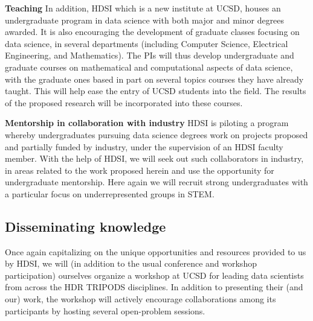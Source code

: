 \documentclass{article}
\begin{document}
{\bf Teaching} In addition,  HDSI which is a new institute at UCSD, houses an undergraduate program in data science with both major and minor degrees awarded.  It is also encouraging the development of graduate classes focusing on data science, in several departments (including Computer Science, Electrical Engineering, and Mathematics). The PIs will thus develop undergraduate and graduate courses on mathematical and computational aspects of data science, with the graduate ones based in part on several topics courses
they have already taught. This will help ease the entry of UCSD  students into the field. The
results of the proposed research will be incorporated into these courses. 

{\bf Mentorship in collaboration with industry} HDSI is piloting a program whereby undergraduates pursuing data science degrees work on projects proposed and partially funded by industry, under the supervision of an HDSI faculty member. With the help of HDSI, we will seek out such collaborators in industry, in areas related to the work proposed herein and use the opportunity for undergraduate mentorship. Here again we will recruit strong undergraduates with a particular focus on underrepresented groups in STEM.

\subsection*{Disseminating knowledge}
Once again capitalizing on the unique opportunities and resources provided to us by HDSI, we will (in addition to the usual conference and workshop participation) ourselves organize a workshop at UCSD for leading data scientists from across the HDR TRIPODS disciplines. In addition to presenting their (and our) work, the workshop will actively encourage collaborations among its participants by hosting several open-problem sessions.
\end{document}
